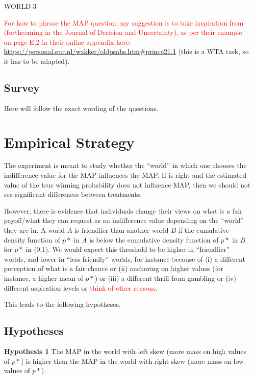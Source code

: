 WORLD 3

\textcolor{red}{For how to phrase the MAP question, my suggestion is to take inspiration from} \cite{Johnson2019} \textcolor{red}{(forthcoming in the Journal of Decision and Uncertainty), as per their example on page E.2 in their online appendix here:} \url{https://personal.eur.nl/wakker/oldpsabs.htm#prince21.1} (this is a WTA task, so it has to be adapted).

\subsection{Survey}

Here will follow the exact wording of the questions.



\section{Empirical Strategy}

The experiment is meant to study whether the ``world'' in which one chooses the indifference value for the MAP influences the MAP.
If \cite{Bohnet2008} is right and the estimated value of the true winning probability does not influence MAP, then we should not see significant differences between treatments.

However, there is evidence that individuals change their views on what is a fair payoff/what they can request as an indifference value depending on the ``world'' they are in.
A world $A$ is friendlier than another world $B$ if the cumulative density function of $p*$ in $A$ is below the cumulative density function of $p*$ in $B$ for $p*$ in (0,1).
We would expect this threshold to be higher in ``friendlier'' worlds, and lower in ``less friendly'' worlds, for instance because of (i) a different perception of what is a fair chance or (ii) anchoring on higher values (for instance, a higher mean of $p*$) or (iii) a different thrill from gambling or (iv) different aspiration levels or \textcolor{red}{think of other reasons}.

This leads to the following hypotheses.

\subsection{Hypotheses}

\noindent \textbf{Hypothesis 1} \quad The MAP in the world with left skew (more mass on high values of $p*$) is higher than the MAP in the world with right skew (more mass on low values of $p*$).

